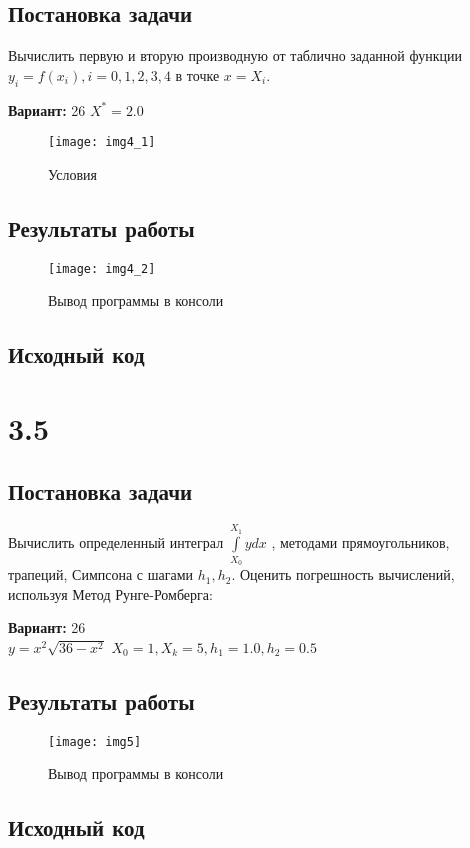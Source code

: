 \subsection{Постановка задачи}
Вычислить первую и вторую производную от таблично заданной функции $y_i=f(x_i), i=0,1,2,3,4$  в точке $x=X_i$.   

{\bfseries Вариант:} 26
$X^*=2.0$

\begin{figure}[h!]
\centering
\texttt{[image: img4\_1]}
\caption{Условия}
\end{figure}

\subsection{Результаты работы}
\begin{figure}[h!]
\centering
\texttt{[image: img4\_2]}
\caption{Вывод программы в консоли}
\end{figure}
\pagebreak

\subsection{Исходный код}


\pagebreak
\section* {3.5}

\subsection{Постановка задачи}
Вычислить определенный интеграл $\int\limits_{X_0}^{X_1} y dx$  , методами прямоугольников, трапеций, Симпсона с шагами $h_1,h_2$. Оценить погрешность вычислений, используя  Метод Рунге-Ромберга: 

{\bfseries Вариант:} 26\\
$y= x^2 \sqrt{36 - x^2}$
$X_0=1, X_k=5, h_1=1.0, h_2=0.5$

\subsection{Результаты работы}
\begin{figure}[h!]
\centering
\texttt{[image: img5]}
\caption{Вывод программы в консоли}
\end{figure}
\pagebreak


\subsection{Исходный код}


